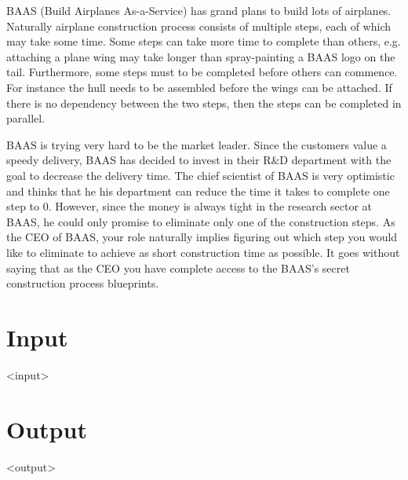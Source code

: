 
BAAS (Build Airplanes As-a-Service) has grand plans to build lots of airplanes.
Naturally airplane construction process consists of multiple steps, each of which may take some time.
Some steps can take more time to complete than others, e.g. attaching a plane wing may take longer than spray-painting a BAAS logo on the tail.
Furthermore, some steps must to be completed before others can commence. For instance the hull needs to be assembled before the wings can be attached.
If there is no dependency between the two steps, then the steps can be completed in parallel.

BAAS is trying very hard to be the market leader.
Since the customers value a speedy delivery, BAAS has decided to invest in their R\&D department with the goal to decrease the delivery time.
The chief scientist of BAAS is very optimistic and thinks that he his department can reduce the time it takes to complete one step to 0.
However, since the money is always tight in the research sector at BAAS, he could only promise to eliminate only one of the construction steps.
As the CEO of BAAS, your role naturally implies figuring out which step you would like to eliminate to achieve as short construction time as possible.
It goes without saying that as the CEO you have complete access to the BAAS's secret construction process blueprints.

\section*{Input}

<input>

\section*{Output}

<output>
